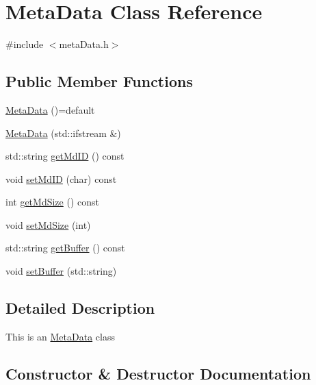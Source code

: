 \hypertarget{classMetaData}{}\section{Meta\+Data Class Reference}
\label{classMetaData}


{\ttfamily \#include $<$meta\+Data.\+h$>$}

\subsection*{Public Member Functions}
\begin{DoxyCompactItemize}
\item 
\hyperlink{classMetaData_a666d1eea92f7243c39dae95de0352b11}{Meta\+Data} ()=default
\item 
\hyperlink{classMetaData_aac49325e3507e976fb41690bfa6be536}{Meta\+Data} (std\+::ifstream \&)
\item 
std\+::string \hyperlink{classMetaData_ad46cdaa2d7d988b9f73cd3c438dd9cb9}{get\+Md\+ID} () const
\item 
void \hyperlink{classMetaData_ad16be865033e4856cf1eaab2dd6e5409}{set\+Md\+ID} (char) const
\item 
int \hyperlink{classMetaData_ab013c35f16c09bc6e69164c2c6df5b46}{get\+Md\+Size} () const
\item 
void \hyperlink{classMetaData_aa500b5bcfc28dfc1f0b32b7fcdca108f}{set\+Md\+Size} (int)
\item 
std\+::string \hyperlink{classMetaData_a105bbcd8cfee4f70c0942ec67154079a}{get\+Buffer} () const
\item 
void \hyperlink{classMetaData_a8993ecf3ca590b956fd1c7383a3f5c24}{set\+Buffer} (std\+::string)
\end{DoxyCompactItemize}


\subsection{Detailed Description}
This is an \hyperlink{classMetaData}{Meta\+Data} class 

\subsection{Constructor \& Destructor Documentation}
\mbox{\label{classMetaData_a666d1eea92f7243c39dae95de0352b11}} 
